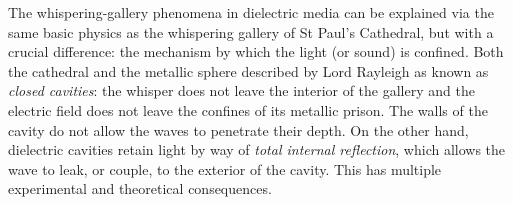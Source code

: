 The whispering-gallery phenomena in dielectric media can be explained
via the same basic physics as the whispering gallery of St Paul's Cathedral, 
but with a crucial difference: the mechanism by which the light (or sound) is confined.
Both the cathedral and the metallic sphere described by Lord Rayleigh as known as 
\textit{closed cavities}: the whisper does not leave the interior of the gallery
and the electric field does not leave the confines of its metallic prison. The
walls of the cavity do not allow the waves to penetrate their depth. On the other hand, 
dielectric cavities retain light by way of \textit{total internal reflection}, which 
allows the wave to leak, or couple, to the exterior of the cavity. This has multiple
experimental and theoretical consequences. 


